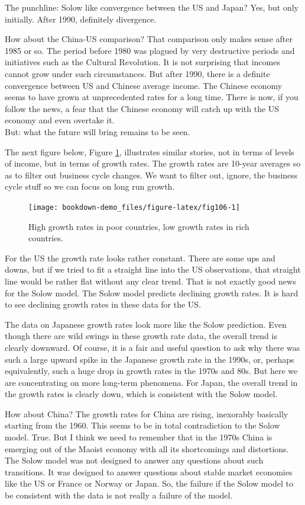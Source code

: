 \documentclass[
]{book}
\begin{document}
The punchline: Solow like convergence between the US and Japan? Yes, but only initially. After 1990, definitely divergence.

How about the China-US comparison? That comparison only makes sense after 1985 or so. The period before 1980 was plagued by very destructive periods and initiatives such as the Cultural Revolution. It is not surprising that incomes cannot grow under such circumstances. But after 1990, there is a definite convergence between US and Chinese average income. The Chinese economy seems to have grown at unprecedented rates for a long time. There is now, if you follow the news, a fear that the Chinese economy will catch up with the US economy and even overtake it.\\
But: what the future will bring remains to be seen.

The next figure below, Figure \ref{fig:fig106}, illustrates similar stories, not in terms of levels of income, but in terms of growth rates. The growth rates are 10-year averages so as to filter out business cycle changes. We want to filter out, ignore, the business cycle stuff so we can focus on long run growth.

\begin{figure}
\texttt{[image: bookdown-demo\_files/figure-latex/fig106-1]} \caption{High growth rates in poor countries, low growth rates in rich countries.}\label{fig:fig106}
\end{figure}

For the US the growth rate looks rather constant. There are some ups and downs, but if we tried to fit a straight line into the US observations, that straight line would be rather flat without any clear trend. That is not exactly good news for the Solow model. The Solow model predicts declining growth rates. It is hard to see declining growth rates in these data for the US.

The data on Japanese growth rates look more like the Solow prediction. Even though there are wild swings in these growth rate data, the overall trend is clearly downward. Of course, it is a fair and useful question to ask why there was such a large upward spike in the Japanese growth rate in the 1990s, or, perhaps equivalently, such a huge drop in growth rates in the 1970s and 80s. But here we are concentrating on more long-term phenomena. For Japan, the overall trend in the growth rates is clearly down, which is consistent with the Solow model.

How about China? The growth rates for China are rising, inexorably basically starting from the 1960. This seems to be in total contradiction to the Solow model. True. But I think we need to remember that in the 1970s China is emerging out of the Maoist economy with all its shortcomings and distortions. The Solow model was not designed to answer any questions about such transitions. It was designed to answer questions about stable market economies like the US or France or Norway or Japan. So, the failure if the Solow model to be consistent with the data is not really a failure of the model.
\end{document}

